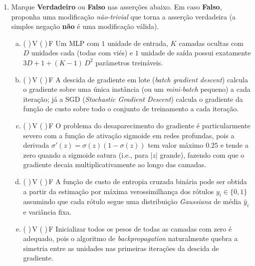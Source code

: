 \documentclass{dlproblemset}
\begin{document}
\begin{enumerate}[1)]
    \textbf{V.} A ReLU satisfaz $\mathrm{ReLU}'(z) = 1$ para $z > 0$ e $\mathrm{ReLU}'(z) = 0$ para $z < 0$; portanto, ao contrário da sigmoide, não satura para entradas positivas grandes, o que ajuda a mitigar o desaparecimento do gradiente.

    \begin{enumerate}[(a)]
        \item Apenas I, II e V estão corretas.
        \item Apenas I e II estão corretas.
        \item Apenas I, II, IV e V estão corretas.
        \item Apenas II, III e V estão corretas.
        \item Apenas I, II e III estão corretas.
        \item Apenas I, IV e V estão corretas.
        \item Todas as afirmações estão corretas.
        \item Apenas III e IV estão corretas.
    \end{enumerate}

    \item Marque \textbf{Verdadeiro} ou \textbf{Falso} nas asserções abaixo. Em caso \textbf{Falso}, proponha uma modificação \emph{não-trivial} que torna a asserção verdadeira (a simples negação \textbf{não} é uma modificação válida).
    \begin{enumerate}[a)]
        \item ( )\,V \quad ( )\,F \quad Um MLP com $1$ unidade de entrada, $K$ camadas ocultas com $D$ unidades cada (todas com viés) e $1$ unidade de saída possui exatamente $3D + 1 + (K - 1)\,D^2$ parâmetros treináveis.
        \item ( )\,V \quad ( )\,F \quad A descida de gradiente em lote (\textit{batch gradient descent}) calcula o gradiente sobre uma única instância (ou um \textit{mini-batch} pequeno) a cada iteração; já a SGD (\textit{Stochastic Gradient Descent}) calcula o gradiente da função de custo sobre todo o conjunto de treinamento a cada iteração.
        \item ( )\,V \quad ( )\,F \quad O problema do desaparecimento do gradiente é particularmente severo com a função de ativação sigmoide em redes profundas, pois a derivada $\sigma'(z) = \sigma(z)(1-\sigma(z))$ tem valor máximo $0.25$ e tende a zero quando a sigmoide satura (i.e., para $|z|$ grande), fazendo com que o gradiente decaia multiplicativamente ao longo das camadas.
        \item ( )\,V \quad ( )\,F \quad A função de custo de entropia cruzada binária pode ser obtida a partir da estimação por máxima verossimilhança dos rótulos $y_i \in \{0, 1\}$ assumindo que cada rótulo segue uma distribuição \emph{Gaussiana} de média $\hat{y}_i$ e variância fixa.
        \item ( )\,V \quad ( )\,F \quad Inicializar todos os pesos de todas as camadas com zero é adequado, pois o algoritmo de \textit{backpropagation} naturalmente quebra a simetria entre as unidades nas primeiras iterações da descida de gradiente.
    \end{enumerate}


\end{enumerate}
\end{document}
